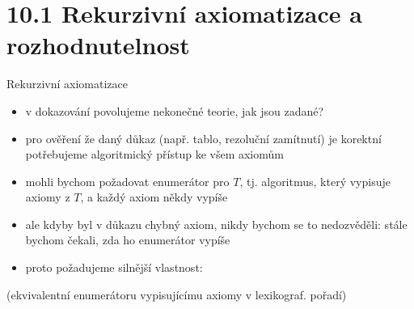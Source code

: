 \documentclass{beamer}
\begin{document}
\section{10.1 Rekurzivní axiomatizace a rozhodnutelnost}


\begin{frame}{Rekurzivní axiomatizace}

    \begin{itemize}
        \item v dokazování povolujeme nekonečné teorie, jak jsou zadané?
        \item pro ověření že daný důkaz (např. tablo, rezoluční zamítnutí) je korektní potřebujeme algoritmický přístup ke všem axiomům
        \item mohli bychom požadovat \alert{enumerátor} pro $T$, tj. algoritmus, který vypisuje axiomy z $T$, a každý axiom někdy vypíše
        \item ale kdyby byl v důkazu chybný axiom, nikdy bychom se to nedozvěděli: stále bychom čekali, zda ho enumerátor vypíše
        \item proto požadujeme silnější vlastnost:
    \end{itemize}


    (ekvivalentní enumerátoru vypisujícímu axiomy v lexikograf. pořadí)  

\end{frame}
\end{document}
